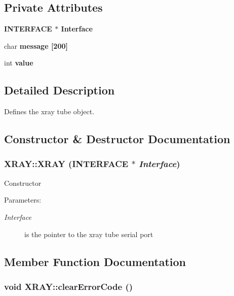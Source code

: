 \subsection*{Private Attributes}
\begin{CompactItemize}
\item 
\bf{INTERFACE} $\ast$ \bf{Interface}
\item 
char \bf{message} [200]
\item 
int \bf{value}
\end{CompactItemize}


\subsection{Detailed Description}
Defines the xray tube object. 



\subsection{Constructor \& Destructor Documentation}
\subsubsection{\setlength{\rightskip}{0pt plus 5cm}XRAY::XRAY (\bf{INTERFACE} $\ast$ {\em Interface})}\label{classXRAY_042b30ae9c27f83b457f2734989f9845}


Constructor \begin{Desc}
\item[Parameters:]
\begin{description}
\item[{\em Interface}]is the pointer to the xray tube serial port \end{description}
\end{Desc}


\subsection{Member Function Documentation}
\subsubsection{\setlength{\rightskip}{0pt plus 5cm}void XRAY::clear\-Error\-Code ()}\label{classXRAY_588576301e32ca48be5b3b0198334894}


